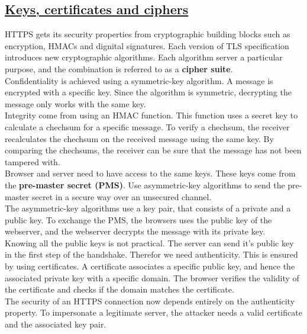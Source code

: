 \documentclass[titlepage]{article}
\begin{document}
    \subsection{\href{https://youtu.be/iCJIF0MtTHQ}{Keys, certificates and ciphers}}
    HTTPS gets its security properties from cryptographic building blocks such as encryption, HMACs and dignital signatures. Each version of TLS specification introduces new cryptographic algorithms. Each algorithm server a particular purpose, and the combination is referred to as a \textbf{cipher suite}.\\
    Confidentiality is achieved using a symmetric-key algorithm. A message is encrypted with a specific key. Since the algorithm is symmetric, decrypting the message only works with the same key.\\
    Integrity come from using an HMAC function. This function uses a secret key to calculate a chechsum for a specific message. To verify a chechsum, the receiver recalculates the chechsum on the received message using the same key. By comparing the chechsums, the receiver can be sure that the message has not been tampered with.\\
    Browser and server need to have access to the same keys. These keys come from the \textbf{pre-master secret (PMS)}. Use asymmetric-key algorithms to send the pre-master secret in a secure way over an unsecured channel.\\
    The asymmetric-key algorithms use a key pair, that consists of a private and a public key. To exchange the PMS, the browsers uses the public key of the webserver, and the webserver decrypts the message with its private key.\\
    Knowing all the public keys is not practical. The server can send it's public key in the first step of the handshake. Therefor we need authenticity. This is ensured by using certificates. A certificate associates a specific public key, and hence the associated private key with a specific domain. The browser verifies the validity of the certificate and checks if the domain matches the certificate.\\
    The security of an HTTPS connection now depends entirely on the authenticity property. To impersonate a legitimate server, the attacker needs a valid certificate and the associated key pair.
\end{document}
